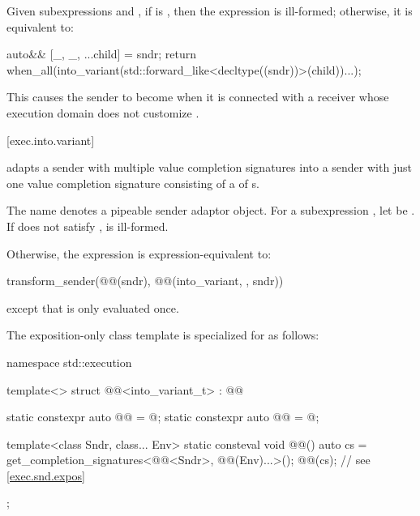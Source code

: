 \pnum
Given subexpressions  and ,
if
is ,
then the expression 
is ill-formed;
otherwise, it is equivalent to:
\begin{codeblock}
auto&& [_, _, ...child] = sndr;
return when_all(into_variant(std::forward_like<decltype((sndr))>(child))...);
\end{codeblock}
\begin{note}
This causes the  sender
to become 
when it is connected with a receiver
whose execution domain does not customize .
\end{note}

[exec.into.variant]{}

\pnum
{} adapts a sender with multiple value completion signatures
into a sender with just one value completion signature
consisting of a  of s.

\pnum
The name  denotes a pipeable sender adaptor object.
For a subexpression , let  be .
If  does not satisfy ,
 is ill-formed.

\pnum
Otherwise, the expression 
is expression-equivalent to:
\begin{codeblock}
transform_sender(@@(sndr), @@(into_variant, {}, sndr))
\end{codeblock}
except that  is only evaluated once.

\pnum
The exposition-only class template 
is specialized for  as follows:
\begin{codeblock}
namespace std::execution {
  template<>
  struct @@<into_variant_t> : @@ {
    static constexpr auto @@ = @\seebelow@;
    static constexpr auto @@ = @\seebelow@;

    template<class Sndr, class... Env>
      static consteval void @@() {
        auto cs = get_completion_signatures<@@<Sndr>, @@(Env)...>();
        @@(cs);   // see \ref{exec.snd.expos}
      }
  };
}
\end{codeblock}

